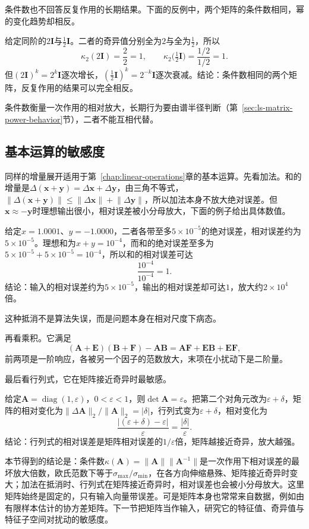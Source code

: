 条件数也不回答反复作用的长期结果。下面的反例中，两个矩阵的条件数相同，幂的变化趋势却相反。
\begin{example}[反例：条件数相同而幂的趋势相反]
\label{ex:ls-condition-number-vs-powers}
给定同阶的$2\bm I$与$\tfrac12\bm I$。二者的奇异值分别全为$2$与全为$\tfrac12$，所以
\[
 \kappa_2(2\bm I)=\frac{2}{2}=1,\qquad
 \kappa_2\bigl(\tfrac12\bm I\bigr)=\frac{1/2}{1/2}=1 .
\]
但$(2\bm I)^k=2^k\bm I$逐次增长，$(\tfrac12\bm I)^k=2^{-k}\bm I$逐次衰减。结论：条件数相同的两个矩阵，反复作用的结果可以完全相反。
\end{example}
条件数衡量一次作用的相对放大，长期行为要由谱半径判断（第~\ref{sec:ls-matrix-power-behavior}节），二者不能互相代替。

\subsection{基本运算的敏感度}

同样的增量展开适用于第~\ref{chap:linear-operations}章的基本运算。先看加法。和的增量是$\Delta(\bm x+\bm y)=\Delta\bm x+\Delta\bm y$，由三角不等式，$\lVert\Delta(\bm x+\bm y)\rVert\leq\lVert\Delta\bm x\rVert+\lVert\Delta\bm y\rVert$，所以加法本身不放大绝对误差。但$\bm x\approx-\bm y$时理想输出很小，相对误差被小分母放大，下面的例子给出具体数值。
\begin{example}[加法中的抵消]
\label{ex:ls-cancellation-relative-error}
给定$x=1.0001$、$y=-1.0000$，二者各带至多$5\times10^{-5}$的绝对误差，相对误差约为$5\times10^{-5}$。理想和为$x+y=10^{-4}$，而和的绝对误差至多为$5\times10^{-5}+5\times10^{-5}=10^{-4}$，所以和的相对误差可达
\[
 \frac{10^{-4}}{10^{-4}}=1 .
\]
结论：输入的相对误差约为$5\times10^{-5}$，输出的相对误差却可达$1$，放大约$2\times10^4$倍。
\end{example}
这种抵消不是算法失误，而是问题本身在相对尺度下病态。

再看乘积。它满足
\[
 (\bm A+\bm E)(\bm B+\bm F)-\bm A\bm B=\bm A\bm F+\bm E\bm B+\bm E\bm F,
\]
前两项是一阶响应，各被另一个因子的范数放大，末项在小扰动下是二阶量。

最后看行列式，它在矩阵接近奇异时最敏感。
\begin{example}[接近奇异时的行列式]
\label{ex:ls-determinant-near-singular}
给定$\bm A=\operatorname{diag}(1,\varepsilon)$，$0<\varepsilon<1$，则$\det\bm A=\varepsilon$。把第二个对角元改为$\varepsilon+\delta$，矩阵的相对变化为$\lVert\Delta\bm A\rVert_2/\lVert\bm A\rVert_2=|\delta|$，行列式变为$\varepsilon+\delta$，相对变化为
\[
 \frac{|(\varepsilon+\delta)-\varepsilon|}{\varepsilon}=\frac{|\delta|}{\varepsilon}.
\]
结论：行列式的相对误差是矩阵相对误差的$1/\varepsilon$倍，矩阵越接近奇异，放大越强。
\end{example}

本节得到的结论是：条件数$\kappa(\bm A)=\lVert\bm A\rVert\lVert\bm A^{-1}\rVert$是一次作用下相对误差的最坏放大倍数，欧氏范数下等于$\sigma_{\max}/\sigma_{\min}$，在各方向伸缩悬殊、矩阵接近奇异时变大；加法在抵消时、行列式在矩阵接近奇异时，相对误差也会被小分母放大。这里矩阵始终是固定的，只有输入向量带误差。可是矩阵本身也常常来自数据，例如由有限样本估计的协方差矩阵。下一节把矩阵当作输入，研究它的特征值、奇异值与特征子空间对扰动的敏感度。
